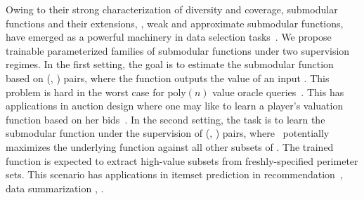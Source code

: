 \documentclass{article}
\renewcommand{\cite}{\citep}
\begin{document}
Owing to their strong characterization of diversity and coverage, submodular functions and their extensions, \viz, weak and approximate submodular functions, have emerged as a powerful machinery in data selection tasks~\cite{killamsetty2020glister, wei2015submodularity, hashemi2019submodular, ren2018learning, zhang2018generalized, powers2018differentiable,b1,b2,b3}.
%
We propose trainable parameterized families of submodular functions under two supervision regimes. In the first setting, the goal is to estimate the submodular function based on (\tset, \tvalue) pairs, where the function outputs the value of an input \tset.  This problem is hard in the worst case for $\text{poly}(n)$ value oracle queries~\cite{reb}.  This has  applications in auction design where one may like to learn a player's valuation function based on her bids~\cite{balcan2011learning}.  In the second setting, the task is to learn the submodular function under the supervision of (\tuniv, \thigh) pairs, where \thigh\ potentially maximizes the underlying function against all other subsets of \tuniv.  The trained function is expected to extract high-value subsets from freshly-specified perimeter sets.
This scenario has applications in  itemset prediction in recommendation~\cite{tschiatschek2016learning, tschiatschek2018differentiable}, data summarization \cite{kothawade2020deep, badanidiyuru2014streaming, bairi2015summarization, dasgupta2013summarization, Singla2016}, \etc.

%
 
\end{document}

